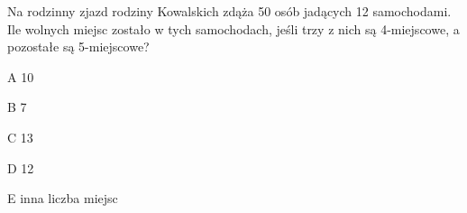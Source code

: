 \begin{tresc}
Na rodzinny zjazd rodziny Kowalskich zdąża 50 osób jadących 12 samochodami. Ile wolnych miejsc zostało w tych samochodach, jeśli trzy z nich są 4-miejscowe, a pozostałe są 5-miejscowe?
\end{tresc}
\begin{wariant}{A} 10 \end{wariant}
\begin{wariant}{B} 7 \end{wariant}
\begin{wariant}{C} 13 \end{wariant}
\begin{wariant}{D} 12 \end{wariant}
\begin{wariant}{E} inna liczba miejsc \end{wariant}

